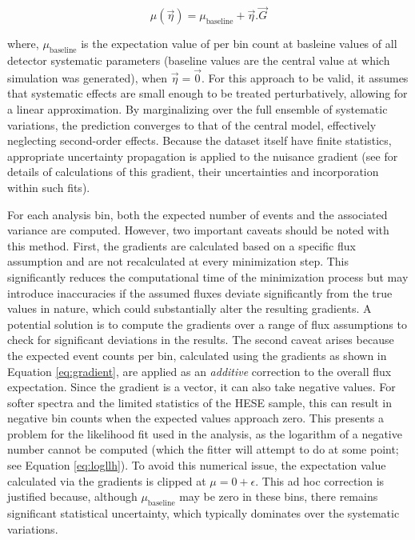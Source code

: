 \begin{equation}\label{eq:gradient}
    \mu(\vec{\eta})  = \mu_{\mathrm{baseline}} + \vec{\eta}.\vec{G}
\end{equation}

where, $\mu_{\mathrm{baseline}}$ is the expectation value of per bin count at basleine values of all detector systematic parameters (baseline values are the central value at which simulation was generated), when $\vec{\eta}=\vec{0}$. For this approach to be valid, it assumes that systematic effects are small enough to be treated perturbatively, allowing for a linear approximation. By marginalizing over the full ensemble of systematic variations, the prediction converges to that of the central model, effectively neglecting second-order effects. Because the dataset itself have finite statistics, appropriate uncertainty propagation is applied to the nuisance gradient (see  for details of calculations of this gradient, their uncertainties and incorporation within such fits). 

For each analysis bin, both the expected number of events and the associated variance are computed. However, two important caveats should be noted with this method. First, the gradients are calculated based on a specific flux assumption and are not recalculated at every minimization step. This significantly reduces the computational time of the minimization process but may introduce inaccuracies if the assumed fluxes deviate significantly from the true values in nature, which could substantially alter the resulting gradients. A potential solution is to compute the gradients over a range of flux assumptions to check for significant deviations in the results. The second caveat arises because the expected event counts per bin, calculated using the gradients as shown in Equation \ref{eq:gradient}, are applied as an \emph{additive} correction to the overall flux expectation. Since the gradient is a vector, it can also take negative values. For softer spectra and the limited statistics of the HESE sample, this can result in negative bin counts when the expected values approach zero. This presents a problem for the likelihood fit used in the analysis, as the logarithm of a negative number cannot be computed (which the fitter will attempt to do at some point; see Equation \ref{eq:logllh}). To avoid this numerical issue, the expectation value calculated via the gradients is clipped at $\mu = 0 + \epsilon$. This ad hoc correction is justified because, although $\mu_{\mathrm{baseline}}$ may be zero in these bins, there remains significant statistical uncertainty, which typically dominates over the systematic variations.


